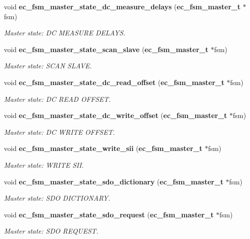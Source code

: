 \begin{DoxyCompactItemize}
void {\bf ec\-\_\-fsm\-\_\-master\-\_\-state\-\_\-dc\-\_\-measure\-\_\-delays} ({\bf ec\-\_\-fsm\-\_\-master\-\_\-t} $\ast$fsm)
\begin{DoxyCompactList}\small\item\em \-Master state\-: \-D\-C \-M\-E\-A\-S\-U\-R\-E \-D\-E\-L\-A\-Y\-S. \end{DoxyCompactList}\item 
void {\bf ec\-\_\-fsm\-\_\-master\-\_\-state\-\_\-scan\-\_\-slave} ({\bf ec\-\_\-fsm\-\_\-master\-\_\-t} $\ast$fsm)
\begin{DoxyCompactList}\small\item\em \-Master state\-: \-S\-C\-A\-N \-S\-L\-A\-V\-E. \end{DoxyCompactList}\item 
void {\bf ec\-\_\-fsm\-\_\-master\-\_\-state\-\_\-dc\-\_\-read\-\_\-offset} ({\bf ec\-\_\-fsm\-\_\-master\-\_\-t} $\ast$fsm)
\begin{DoxyCompactList}\small\item\em \-Master state\-: \-D\-C \-R\-E\-A\-D \-O\-F\-F\-S\-E\-T. \end{DoxyCompactList}\item 
void {\bf ec\-\_\-fsm\-\_\-master\-\_\-state\-\_\-dc\-\_\-write\-\_\-offset} ({\bf ec\-\_\-fsm\-\_\-master\-\_\-t} $\ast$fsm)
\begin{DoxyCompactList}\small\item\em \-Master state\-: \-D\-C \-W\-R\-I\-T\-E \-O\-F\-F\-S\-E\-T. \end{DoxyCompactList}\item 
void {\bf ec\-\_\-fsm\-\_\-master\-\_\-state\-\_\-write\-\_\-sii} ({\bf ec\-\_\-fsm\-\_\-master\-\_\-t} $\ast$fsm)
\begin{DoxyCompactList}\small\item\em \-Master state\-: \-W\-R\-I\-T\-E \-S\-I\-I. \end{DoxyCompactList}\item 
void {\bf ec\-\_\-fsm\-\_\-master\-\_\-state\-\_\-sdo\-\_\-dictionary} ({\bf ec\-\_\-fsm\-\_\-master\-\_\-t} $\ast$fsm)
\begin{DoxyCompactList}\small\item\em \-Master state\-: \-S\-D\-O \-D\-I\-C\-T\-I\-O\-N\-A\-R\-Y. \end{DoxyCompactList}\item 
void {\bf ec\-\_\-fsm\-\_\-master\-\_\-state\-\_\-sdo\-\_\-request} ({\bf ec\-\_\-fsm\-\_\-master\-\_\-t} $\ast$fsm)
\begin{DoxyCompactList}\small\item\em \-Master state\-: \-S\-D\-O \-R\-E\-Q\-U\-E\-S\-T. \end{DoxyCompactList}\item 

\end{DoxyCompactItemize}
